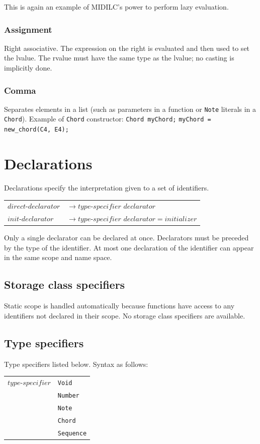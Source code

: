 \documentclass[12pt,A4]{book}
\begin{document}
This is again an example of MIDILC’s power to perform lazy evaluation.
\subsubsection{Assignment}
Right associative. The expression on the right is evaluated and then used to set the lvalue. The rvalue must have the same type as the lvalue; no casting is implicitly done.
\subsubsection{Comma}
Separates elements in a list (such as parameters in a function or \verb|Note| literals in a \verb|Chord|). Example of \verb|Chord| constructor:
\verb|Chord myChord;| \verb|myChord = new_chord(C4, E4);|
\section{Declarations}
Declarations specify the interpretation given to a set of identifiers.

\begin{tabular}{l l}
$direct\mbox{-}declarator$ & $\rightarrow type\mbox{-}specifier$ $declarator$\\
$init\mbox{-}declarator$ & $\rightarrow type\mbox{-}specifier$ $declarator = initializer$
\end{tabular}

Only a single declarator can be declared at once.  Declarators must be preceded by the type of the identifier.  At most one declaration of the identifier can appear in the same scope and name space.  
\subsection{Storage class specifiers}
Static scope is handled automatically because functions have access to any identifiers not declared in their scope. No storage class specifiers are available.
\subsection{Type specifiers}
Type specifiers listed below.  Syntax as follows:

\begin{tabular}{l l}
$type\mbox{-}specifier$  & \verb|Void| \\
& \verb|Number|\\
& \verb|Note|\\
& \verb|Chord|\\
& \verb|Sequence|
\end{tabular}
\end{document}
